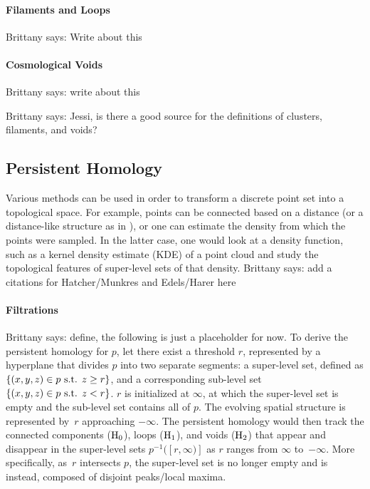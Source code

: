 \documentclass[12pt]{article}
\newcommand{\brittany}[1]{{\color{cyan} Brittany says: #1}}
\begin{document}
\paragraph{Filaments and Loops} \brittany{Write about this}

\paragraph{Cosmological Voids} \brittany{write about this}

\brittany{Jessi, is there a good source for the definitions of clusters, filaments, and voids?}

\subsection{Persistent Homology} 
Various methods can be used in order to transform a discrete point set into a
topological space. For example, points can be connected based on a distance (or
a distance-like structure as in \cite{chazal2011geometric}), or one can estimate
the density from which the points were sampled.  In the latter case, one would
look at a density function, such as a kernel density estimate (KDE) of a point
cloud and study the topological features of super-level sets of that density.
\brittany{add a citations for Hatcher/Munkres and Edels/Harer here}

\paragraph{Filtrations}
\brittany{define, the following is just a placeholder for now.}
To derive the persistent homology for $p$, let there exist a threshold
$r$, represented by a hyperplane that divides $p$ into two separate segments: a
super-level set, defined as $\{(x,y,z) \in p \textup{ s.t. } z \geq r \}$, and a
corresponding sub-level set $\{(x,y,z) \in p \textup{ s.t. } z < r \}$. $r$ is
initialized at $\infty$, at which the super-level set is empty and the sub-level
set contains all of $p$. The evolving spatial structure is represented by~$r$
approaching $-\infty$. The persistent homology would then track the connected
components ($\textup{H}_{0}$), loops ($\textup{H}_{1}$), and voids
($\textup{H}_{2}$) that appear and disappear in the super-level sets
$p^{-1}([r,\infty)]$ as $r$ ranges from $\infty$ to~$-\infty$. More
specifically, as~$r$ intersects $p$, the super-level set is no longer empty and
is instead, composed of disjoint peaks/local maxima.
\end{document}
